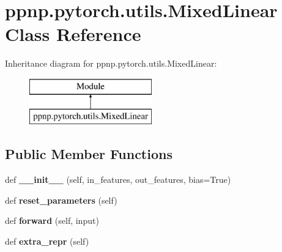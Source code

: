 \hypertarget{classppnp_1_1pytorch_1_1utils_1_1MixedLinear}{}\section{ppnp.\+pytorch.\+utils.\+Mixed\+Linear Class Reference}
\label{classppnp_1_1pytorch_1_1utils_1_1MixedLinear}
Inheritance diagram for ppnp.\+pytorch.\+utils.\+Mixed\+Linear\+:\begin{figure}[H]
\begin{center}
\leavevmode
\includegraphics[height=2.000000cm]{classppnp_1_1pytorch_1_1utils_1_1MixedLinear}
\end{center}
\end{figure}
\subsection*{Public Member Functions}
\begin{DoxyCompactItemize}
\item 
\mbox{\label{classppnp_1_1pytorch_1_1utils_1_1MixedLinear_a54050e28029ba7c70a15620ad94f9a7f}} 
def {\bfseries \+\_\+\+\_\+init\+\_\+\+\_\+} (self, in\+\_\+features, out\+\_\+features, bias=True)
\item 
\mbox{\label{classppnp_1_1pytorch_1_1utils_1_1MixedLinear_a700826606db753044f5b76533ae750bd}} 
def {\bfseries reset\+\_\+parameters} (self)
\item 
\mbox{\label{classppnp_1_1pytorch_1_1utils_1_1MixedLinear_ac92ac61b00904a74dff7b293464c6242}} 
def {\bfseries forward} (self, input)
\item 
\mbox{\label{classppnp_1_1pytorch_1_1utils_1_1MixedLinear_a1a6025b41ff70ecefd344ac29286a367}} 
def {\bfseries extra\+\_\+repr} (self)
\end{DoxyCompactItemize}
